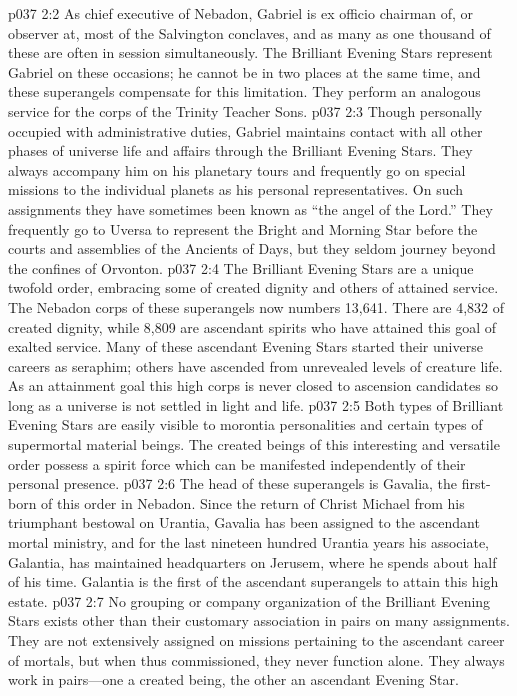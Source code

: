 \vs p037 2:2 As chief executive of Nebadon, Gabriel is ex officio chairman of, or observer at, most of the Salvington conclaves, and as many as one thousand of these are often in session simultaneously. The Brilliant Evening Stars represent Gabriel on these occasions; he cannot be in two places at the same time, and these superangels compensate for this limitation. They perform an analogous service for the corps of the Trinity Teacher Sons.
\vs p037 2:3 Though personally occupied with administrative duties, Gabriel maintains contact with all other phases of universe life and affairs through the Brilliant Evening Stars. They always accompany him on his planetary tours and frequently go on special missions to the individual planets as his personal representatives. On such assignments they have sometimes been known as “the angel of the Lord.” They frequently go to Uversa to represent the Bright and Morning Star before the courts and assemblies of the Ancients of Days, but they seldom journey beyond the confines of Orvonton.
\pc \vs p037 2:4 The Brilliant Evening Stars are a unique twofold order, embracing some of created dignity and others of attained service. The Nebadon corps of these superangels now numbers 13,641. There are 4,832 of created dignity, while 8,809 are ascendant spirits who have attained this goal of exalted service. Many of these ascendant Evening Stars started their universe careers as seraphim; others have ascended from unrevealed levels of creature life. As an attainment goal this high corps is never closed to ascension candidates so long as a universe is not settled in light and life.
\vs p037 2:5 Both types of Brilliant Evening Stars are easily visible to morontia personalities and certain types of supermortal material beings. The created beings of this interesting and versatile order possess a spirit force which can be manifested independently of their personal presence.
\pc \vs p037 2:6 The head of these superangels is Gavalia, the first\hyp{}born of this order in Nebadon. Since the return of Christ Michael from his triumphant bestowal on Urantia, Gavalia has been assigned to the ascendant mortal ministry, and for the last nineteen hundred Urantia years his associate, Galantia, has maintained headquarters on Jerusem, where he spends about half of his time. Galantia is the first of the ascendant superangels to attain this high estate.
\vs p037 2:7 No grouping or company organization of the Brilliant Evening Stars exists other than their customary association in pairs on many assignments. They are not extensively assigned on missions pertaining to the ascendant career of mortals, but when thus commissioned, they never function alone. They always work in pairs---one a created being, the other an ascendant Evening Star.
